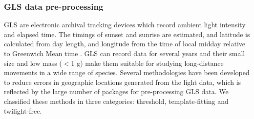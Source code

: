 \documentclass[a4paper,12pt]{article}
\begin{document}
	\subsubsection*{GLS data pre-processing} 
	
	GLS are electronic archival tracking devices which record ambient light intensity and elapsed time. The timings of sunset and sunrise are estimated, and latitude is calculated from day length, and longitude from the time of local midday relative to Greenwich Mean time \citep{Afanasyev2004}. GLS can record data for several years and their small size and low mass ($<$1 g) make them suitable for studying long-distance movements in a wide range of species. Several methodologies have been developed to reduce errors in geographic locations generated from the light data, which is reflected by the large number of packages for pre-processing GLS data. We classified these methods in three categories: threshold, template-fitting and twilight-free.
	
\end{document}
